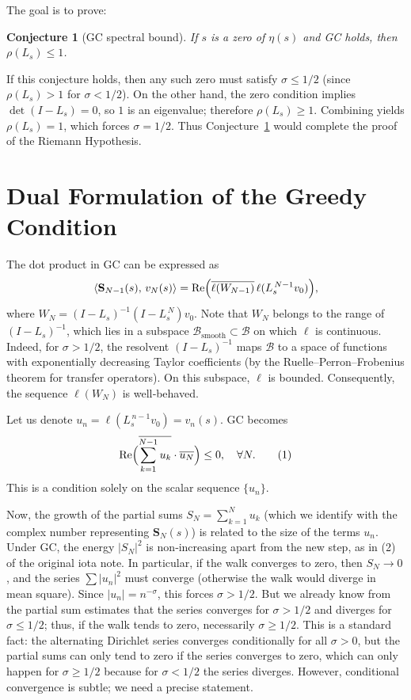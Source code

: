 \documentclass[11pt,a4paper]{article}
\newtheorem{conjecture}[theorem]{Conjecture}
\newcommand{\RE}{\operatorname{Re}}
\begin{document}
The goal is to prove:

\begin{conjecture}[GC spectral bound]\label{conj:main}
If \(s\) is a zero of \(\eta(s)\) and GC holds, then \(\rho(L_s) \le 1\).
\end{conjecture}

If this conjecture holds, then any such zero must satisfy \(\sigma \le 1/2\) (since \(\rho(L_s) > 1\) for \(\sigma < 1/2\)).  On the other hand, the zero condition implies \(\det(I-L_s) = 0\), so \(1\) is an eigenvalue; therefore \(\rho(L_s) \ge 1\).  Combining yields \(\rho(L_s) = 1\), which forces \(\sigma = 1/2\).  Thus Conjecture~\ref{conj:main} would complete the proof of the Riemann Hypothesis.

\section{Dual Formulation of the Greedy Condition}
The dot product in GC can be expressed as
\[
\langle \mathbf{S}_{N-1}(s),\, v_N(s) \rangle = \RE\Bigl( \overline{ \ell( W_{N-1} ) } \, \ell( L_s^{\,N-1} v_0 ) \Bigr),
\]
where \(W_N = (I - L_s)^{-1} (I - L_s^{\,N}) v_0\).  Note that \(W_N\) belongs to the range of \((I - L_s)^{-1}\), which lies in a subspace \(\mathcal{B}_{\mathrm{smooth}} \subset \mathcal{B}\) on which \(\ell\) is continuous.  Indeed, for \(\sigma > 1/2\), the resolvent \((I - L_s)^{-1}\) maps \(\mathcal{B}\) to a space of functions with exponentially decreasing Taylor coefficients (by the Ruelle–Perron–Frobenius theorem for transfer operators).  On this subspace, \(\ell\) is bounded.  Consequently, the sequence \(\ell(W_N)\) is well‑behaved.

Let us denote \(u_n = \ell( L_s^{\,n-1} v_0 ) = v_n(s)\).  GC becomes
\[
\RE\Bigl( \overline{ \sum_{k=1}^{N-1} u_k } \cdot \overline{u_N} \Bigr) \le 0, \quad \forall N.
\tag{1}
\]
This is a condition solely on the scalar sequence \(\{u_n\}\).

Now, the growth of the partial sums \(S_N = \sum_{k=1}^{N} u_k\) (which we identify with the complex number representing \(\mathbf{S}_N(s)\)) is related to the size of the terms \(u_n\).  Under GC, the energy \(|S_N|^2\) is non‑increasing apart from the new step, as in (2) of the original iota note.  In particular, if the walk converges to zero, then \(S_N \to 0\), and the series \(\sum |u_n|^2\) must converge (otherwise the walk would diverge in mean square).  Since \(|u_n| = n^{-\sigma}\), this forces \(\sigma > 1/2\).  But we already know from the partial sum estimates that the series converges for \(\sigma > 1/2\) and diverges for \(\sigma \le 1/2\); thus, if the walk tends to zero, necessarily \(\sigma \ge 1/2\).  This is a standard fact: the alternating Dirichlet series converges conditionally for all \(\sigma > 0\), but the partial sums can only tend to zero if the series converges to zero, which can only happen for \(\sigma \ge 1/2\) because for \(\sigma < 1/2\) the series diverges.  However, conditional convergence is subtle; we need a precise statement.
\end{document}
